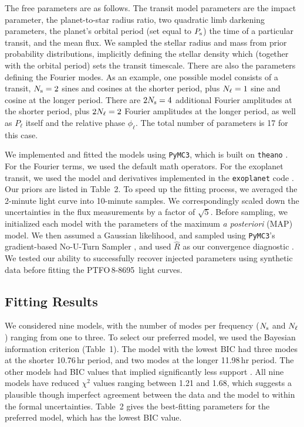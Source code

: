 \documentclass[12pt,twocolumn,tighten]{aastex62}
\newcommand{\ptfo}{PTFO$\,$8-8695}
\begin{document}
The free parameters are as follows.  The transit model parameters are
the impact parameter, the planet-to-star radius ratio, two quadratic
limb darkening parameters, the planet's orbital period (set equal to
$P_{\rm s}$) the time of a particular transit, and the mean flux.  We
sampled the stellar radius and mass from prior probability
distributions, implicitly defining the stellar density which (together
with the orbital period) sets the transit timescale.  There are also
the parameters defining the Fourier modes.  As an example, one
possible model consists of a transit, $N_{\rm s}=2$ sines and cosines
at the shorter period, plus $N_{\rm \ell}=1$ sine and cosine at the
longer period.  There are $2N_{\rm s}=4$ additional Fourier amplitudes
at the shorter period, plus $2N_{\rm \ell}=2$ Fourier amplitudes at
the longer period, as well as $P_\ell$ itself and the relative phase
$\phi_\ell$.  The total number of parameters is 17 for this case.

We implemented and fitted the models using \texttt{PyMC3}, which is
built on \texttt{theano}
\citep{salvatier_2016_PyMC3,exoplanet:theano}.  For the Fourier terms,
we used the default math operators.  For the exoplanet transit, we
used the model and derivatives implemented in the \texttt{exoplanet}
code \citep{exoplanet:exoplanet}.  Our priors are listed in Table~2.
To speed up the fitting process, we averaged the 2-minute light curve
into 10-minute samples.  We correspondingly scaled down the
uncertainties in the flux measurements by a factor of $\sqrt{5}$.
Before sampling, we initialized each model with the parameters of the
maximum {\it a posteriori} (MAP) model.  We then assumed a Gaussian
likelihood, and sampled using \texttt{PyMC3}'s gradient-based
No-U-Turn Sampler \citep{hoffman_no-u-turn_2014}, and used $\hat{R}$
as our convergence diagnostic \citep{gelman_inference_1992}.  We
tested our ability to successfully recover injected parameters using
synthetic data before fitting the \ptfo\ light curves.


\subsection{Fitting Results}

We considered nine models, with the number of modes per frequency
($N_{\rm s}$ and $N_{\rm \ell}$) ranging from one to three.  To select
our preferred model, we used the Bayesian information criterion
(Table~1).  The model with the lowest BIC had three modes at the
shorter 10.76$\,$hr period, and two modes at the longer 11.98$\,$hr
period.  The other models had BIC values that implied significantly
less support \citep{burnham_multimodel_2016}.  All nine models have
reduced $\chi^2$ values ranging between 1.21 and 1.68, which suggests
a plausible though imperfect agreement between the data and the model
to within the formal uncertainties.  Table~2 gives the best-fitting
parameters for the preferred model, which has the lowest BIC value.
\end{document}
